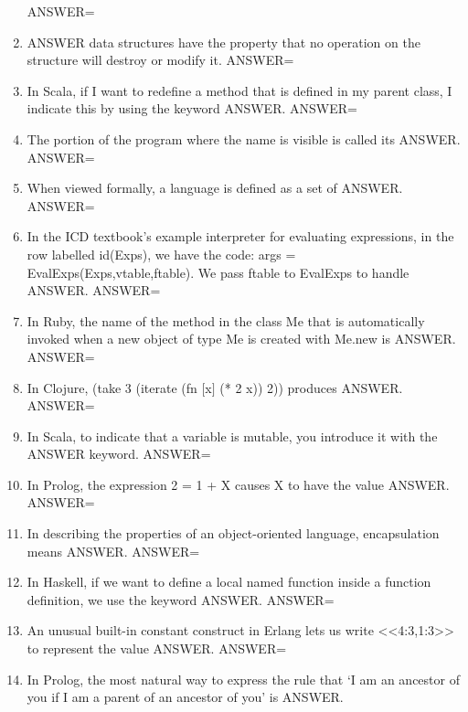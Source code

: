 \documentclass{exam}
\begin{document}
\begin{enumerate}
ANSWER=
\item ANSWER data structures have the property that no operation on the structure will destroy or modify it.\newline
ANSWER=
\item In Scala, if I want to redefine a method that is defined in my parent class, I indicate this by using the keyword ANSWER.\newline
ANSWER=
\item The portion of the program where the name is visible is called its ANSWER.\newline
ANSWER=
\item When viewed formally, a language is defined as a set of ANSWER.\newline
ANSWER=
\item In the ICD textbook's example interpreter for evaluating expressions, in the row labelled id(Exps), we have the code: args = EvalExps(Exps,vtable,ftable).  We pass ftable to EvalExps to handle ANSWER.\newline
ANSWER=
\item In Ruby, the name of the method in the class Me that is automatically invoked when a new object of type Me is created with Me.new is ANSWER.\newline
ANSWER=
\item In Clojure, (take 3 (iterate (fn $\lbrack$x$\rbrack$ (* 2 x)) 2)) produces ANSWER.\newline
ANSWER=
\item In Scala, to indicate that a variable is mutable, you introduce it with the ANSWER keyword.\newline
ANSWER=
\item In Prolog, the expression 2 = 1 + X causes X to have the value ANSWER.\newline
ANSWER=
\item In describing the properties of an object-oriented language, encapsulation means ANSWER.\newline
ANSWER=
\item In Haskell, if we want to define a local named function inside a function definition, we use the keyword ANSWER.\newline
ANSWER=
\item An unusual built-in constant construct in Erlang lets us write <<4:3,1:3>> to represent the value ANSWER.\newline
ANSWER=
\item In Prolog, the most natural way to express the rule that `I am an ancestor of you if I am a parent of an ancestor of you' is ANSWER.\newline

\end{enumerate}
\end{document}
